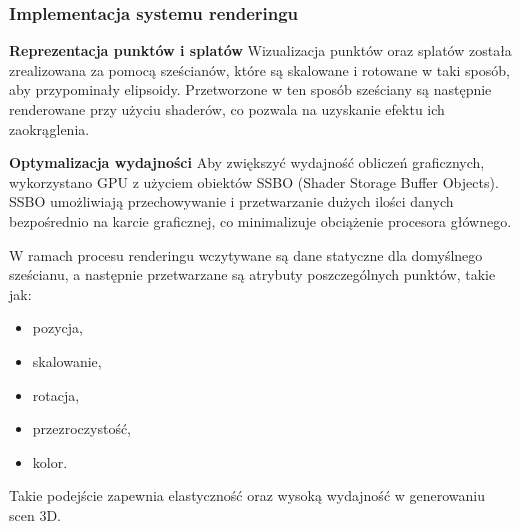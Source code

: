 \subsubsection{Implementacja systemu renderingu}

\textbf{Reprezentacja punktów i splatów}
Wizualizacja punktów oraz splatów została zrealizowana za pomocą sześcianów, które są skalowane i rotowane w taki sposób, aby przypominały elipsoidy. Przetworzone w ten sposób sześciany są następnie renderowane przy użyciu shaderów, co pozwala na uzyskanie efektu ich zaokrąglenia.

\textbf{Optymalizacja wydajności}
Aby zwiększyć wydajność obliczeń graficznych, wykorzystano GPU z użyciem obiektów SSBO (Shader Storage Buffer Objects). SSBO umożliwiają przechowywanie i przetwarzanie dużych ilości danych bezpośrednio na karcie graficznej, co minimalizuje obciążenie procesora głównego.

W ramach procesu renderingu wczytywane są dane statyczne dla domyślnego sześcianu, a następnie przetwarzane są atrybuty poszczególnych punktów, takie jak:
\begin{itemize}
    \item pozycja,
    \item skalowanie,
    \item rotacja,
    \item przezroczystość,
    \item kolor.
\end{itemize}

Takie podejście zapewnia elastyczność oraz wysoką wydajność w generowaniu scen 3D.